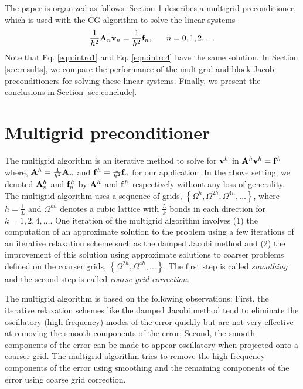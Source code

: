 \documentclass[11pt]{iopart}
\begin{document}
The paper is organized as follows. Section \ref{sec:mg} describes a multigrid 
preconditioner, which is used with the CG algorithm to solve the linear systems 
\begin{equation}
\label{eqn:intro4}
\frac{1}{h^2} {\bf A}_n  {\bf v}_n = \frac{1}{h^2} {\bf f}_n, ~~~~~ n = 0,1,2,\ldots
\end{equation}
Note that Eq. \ref{eqn:intro1} and Eq. \ref{eqn:intro4} have the same solution. 
In Section \ref{sec:results}, we compare the performance of the multigrid and block-Jacobi preconditioners for solving these
linear systems. Finally, we present the conclusions in Section \ref{sec:conclude}.

\section{Multigrid preconditioner}
\label{sec:mg}
The multigrid algorithm is an iterative method to solve for ${\bf v}^h$ in ${\bf A}^h {\bf v}^h = {\bf f}^h$ where,
 ${\bf A}^h = \frac{1}{h^2} {\bf A}_n$ and ${\bf f}^h = \frac{1}{h^2} {\bf f}_n$ for our application. In the above setting, we 
denoted ${\bf A}_n^h$ and ${\bf f}_n^h$ by ${\bf A}^h$ and ${\bf f}^h$ respectively 
without any loss of generality. The multigrid algorithm uses a sequence of 
 grids, $\left\{ \Omega^h, \Omega^{2h}, \Omega^{4h}, \ldots \right\}$, where $h = \frac{1}{L}$ and
 $\Omega^{kh}$ denotes a cubic lattice with $\frac{L}{k}$ bonds in each direction for $k = 1, 2, 4, \ldots$. One iteration of the multigrid algorithm
 involves (1) the computation of an approximate solution to the problem using a few iterations of an iterative
 relaxation scheme such as the damped Jacobi method and (2) the improvement of this solution using approximate solutions 
 to coarser problems defined on the coarser grids, $\left\{\Omega^{2h}, \Omega^{4h}, \ldots \right\}$. The first step
 is called {\it{smoothing}} and the second step is called {\it{coarse grid correction}}. 

The multigrid algorithm is based on the following observations: First, the iterative relaxation schemes like the
 damped Jacobi method tend to eliminate the oscillatory (high frequency) modes of the error quickly but are not very effective at
 removing the smooth components of the error; Second, the smooth components of the error can be made to 
 appear oscillatory when projected onto a coarser grid. The multigrid algorithm tries to remove the
 high frequency components of the error using smoothing and the remaining components of the error using 
 coarse grid correction. 
\end{document}
